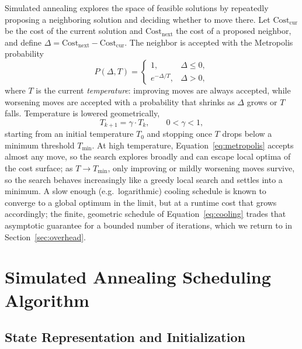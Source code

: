 \documentclass[conference]{IEEEtran}
\begin{document}
    Simulated annealing explores the space of feasible solutions by repeatedly proposing a
    neighboring solution and deciding whether to move there. Let $\text{Cost}_{\text{cur}}$ be the
    cost of the current solution and $\text{Cost}_{\text{next}}$ the cost of a proposed neighbor, and
    define $\Delta = \text{Cost}_{\text{next}} - \text{Cost}_{\text{cur}}$. The neighbor is accepted
    with the Metropolis probability
    \begin{equation}
        P(\Delta, T) =
        \begin{cases}
            1, & \Delta \leq 0, \\
            e^{-\Delta / T}, & \Delta > 0,
        \end{cases}
        \label{eq:metropolis}
    \end{equation}
    where $T$ is the current \emph{temperature}: improving moves are always accepted, while worsening
    moves are accepted with a probability that shrinks as $\Delta$ grows or $T$ falls. Temperature is
    lowered geometrically,
    \begin{equation}
        T_{k+1} = \gamma \cdot T_k, \qquad 0 < \gamma < 1,
        \label{eq:cooling}
    \end{equation}
    starting from an initial temperature $T_0$ and stopping once $T$ drops below a minimum threshold
    $T_{\min}$. At high temperature, Equation~\eqref{eq:metropolis} accepts almost any move, so the
    search explores broadly and can escape local optima of the cost surface; as $T \to T_{\min}$, only
    improving or mildly worsening moves survive, so the search behaves increasingly like a greedy
    local search and settles into a minimum. A slow enough (e.g.\ logarithmic) cooling schedule is
    known to converge to a global optimum in the limit, but at a runtime cost that grows accordingly;
    the finite, geometric schedule of Equation~\eqref{eq:cooling} trades that asymptotic guarantee for
    a bounded number of iterations, which we return to in Section~\ref{sec:overhead}.

    \section{Simulated Annealing Scheduling Algorithm}
    \label{sec:algorithm}

    \subsection{State Representation and Initialization}
    \label{sec:sa-state}
\end{document}
